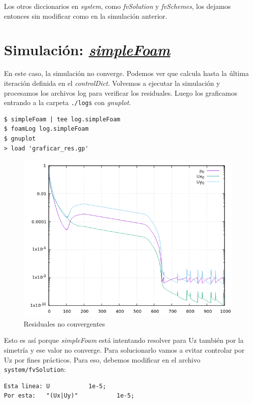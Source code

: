 \documentclass{article}
\begin{document}
\bigskip
Los otros diccionarios en \textit{system}, como \textit{fvSolution} y \textit{fvSchemes}, los dejamos entonces sin modificar como en la simulación anterior.

\section{Simulación: \textit{\href{https://openfoamwiki.net/index.php/SimpleFoam}{simpleFoam}}}
En este caso, la simulación no converge. Podemos ver que calcula hasta la última iteración definida en el \textit{controlDict}.
Volvemos a ejecutar la simulación y procesamos los archivos log para verificar los residuales. Luego los graficamos entrando a la carpeta \texttt{./logs} con \textit{gnuplot}.

\begin{lstlisting}
$ simpleFoam | tee log.simpleFoam
$ foamLog log.simpleFoam
$ gnuplot 
> load 'graficar_res.gp'
\end{lstlisting}

\begin{figure}[h!]
	\centering
	\includegraphics[width=1\textwidth]{Figuras/04_residuales_noconv.png}
	\caption{Residuales no convergentes}
	\label{fig:resid_noconv}
\end{figure}

Esto es así porque \textit{simpleFoam} está intentando resolver para Uz también por la simetría y ese valor no converge.
Para solucionarlo vamos a evitar controlar por Uz por fines prácticos. Para eso, debemos modificar en el archivo \texttt{system/fvSolution}:
\begin{lstlisting}
Esta linea: U			1e-5;
Por esta:   "(Ux|Uy)"           1e-5;
\end{lstlisting}
\end{document}
